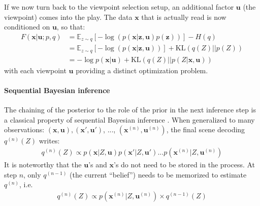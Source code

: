 \documentclass{article}
\begin{document}
If we now turn back to the viewpoint selection setup, an additional factor $\boldsymbol{u}$ (the viewpoint) comes into the play. The data $\boldsymbol{x}$ that is actually read is now conditioned on  $\boldsymbol{u}$, so that:
\begin{align}
F(\boldsymbol{x}|\boldsymbol{u};p,q) 
&= \mathbb{E}_{z\sim q} \left[-\log (p(\boldsymbol{x}|\boldsymbol{z},\boldsymbol{u})p(\boldsymbol{z}))\right] - H(q)\\
&= \mathbb{E}_{z\sim q} \left[-\log (p(\boldsymbol{x}|\boldsymbol{z},\boldsymbol{u}))\right] +\text{KL}(q(Z)||p(Z))
\label{eq:FEP-prior-u}\\
&= - \log p(\boldsymbol{x}|\boldsymbol{u}) + \text{KL}(q(Z)||p(Z|\boldsymbol{x}, \boldsymbol{u}))
\label{eq:FEP-posterior-u}\end{align}
with each viewpoint $\boldsymbol{u}$ providing a distinct optimization problem. 

\paragraph{Sequential Bayesian inference}

The chaining of the posterior to the role of the prior in the next inference step is a classical property of sequential Bayesian inference \cite{wald1945sequential}.
When generalized to many observations: $(\boldsymbol{x},\boldsymbol{u}), (\boldsymbol{x}',\boldsymbol{u}')$, ..., $(\boldsymbol{x}^{(n)},\boldsymbol{u}^{(n)})$, the final scene decoding $q^{(n)}(Z)$ writes:
\begin{align}
q^{(n)}(Z) \propto p(\boldsymbol{x}|Z,\boldsymbol{u}) p(\boldsymbol{x}'|Z,\boldsymbol{u}') ... p(\boldsymbol{x}^{(n)}|Z,\boldsymbol{u}^{(n)}) \label{eq:accum}
\end{align}
It is noteworthy that the $\boldsymbol{u}$'s and $\boldsymbol{x}$'s do not need to be stored in the process. At step $n$, only $q^{(n-1)}$ (the current ``belief'') needs to be memorized to estimate $q^{(n)}$, i.e. 
\begin{align} 
q^{(n)}(Z) \propto p(\boldsymbol{x}^{(n)}|Z,\boldsymbol{u}^{(n)}) \times q^{(n-1)}(Z) \label{eq:accum-post}
\end{align}
\end{document}
